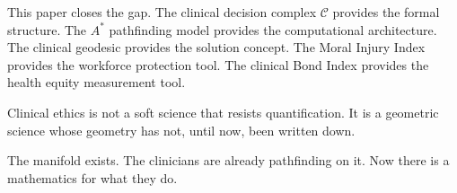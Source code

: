 \documentclass[12pt]{article}
\theoremstyle{definition}
\theoremstyle{remark}
\newcommand{\C}{\mathcal{C}}               %
\begin{document}
This paper closes the gap.  The clinical decision complex $\C$ provides the formal structure.  The $A^*$ pathfinding model provides the computational architecture.  The clinical geodesic provides the solution concept.  The Moral Injury Index provides the workforce protection tool.  The clinical Bond Index provides the health equity measurement tool.

Clinical ethics is not a soft science that resists quantification.  It is a geometric science whose geometry has not, until now, been written down.

The manifold exists.  The clinicians are already pathfinding on it.  Now there is a mathematics for what they do.


\end{document}
